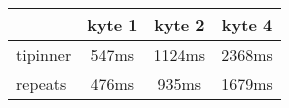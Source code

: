 \begin{tabular}{|l|c|c|c|}
\hline
 & kyte 1 & kyte 2 & kyte 4\\
\hline
tipinner &  547ms &  1124ms &  2368ms\\
\hline
repeats &  476ms &  935ms &  1679ms\\
\hline
\end{tabular}

